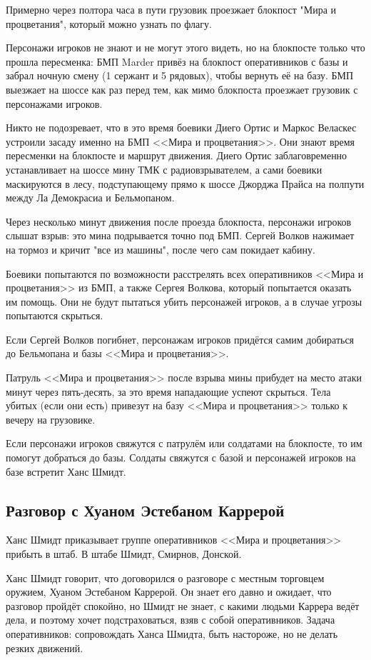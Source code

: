 \documentclass{article}
\begin{document}
Примерно через полтора часа в пути грузовик проезжает блокпост "Мира и
процветания", который можно узнать по флагу.

Персонажи игроков не знают и не могут этого видеть, но на блокпосте
только что прошла пересменка: БМП Marder привёз на блокпост
оперативников с базы и забрал ночную смену (1 сержант и 5 рядовых),
чтобы вернуть её на базу. БМП выезжает на шоссе как раз перед тем, как
мимо блокпоста проезжает грузовик с персонажами игроков.

Никто не подозревает, что в это время боевики Диего Ортис и Маркос
Веласкес устроили засаду именно на БМП <<Мира и процветания>>. Они знают
время пересменки на блокпосте и маршрут движения. Диего Ортис
заблаговременно устанавливает на шоссе мину ТМК с радиовзрывателем, а
сами боевики маскируются в лесу, подступающему прямо к шоссе Джорджа
Прайса на полпути между Ла Демокрасиа и Бельмопаном.

Через несколько минут движения после проезда блокпоста, персонажи
игроков слышат взрыв: это мина подрывается точно под БМП. Сергей Волков
нажимает на тормоз и кричит "все из машины", после чего сам покидает
кабину.

Боевики попытаются по возможности расстрелять всех оперативников <<Мира и
процветания>> из БМП, а также Сергея Волкова, который попытается оказать
им помощь. Они не будут пытаться убить персонажей игроков, а в случае
угрозы попытаются скрыться.

Если Сергей Волков погибнет, персонажам игроков придётся самим
добираться до Бельмопана и базы <<Мира и процветания>>.

Патруль <<Мира и процветания>> после взрыва мины прибудет на место атаки
минут через пять-десять, за это время нападающие успеют скрыться. Тела
убитых (если они есть) привезут на базу <<Мира и процветания>> только к
вечеру на грузовике.

Если персонажи игроков свяжутся с патрулём или солдатами на блокпосте,
то им помогут добраться до базы. Солдаты свяжутся с базой и персонажей
игроков на базе встретит Ханс Шмидт.

\subsection{Разговор с Хуаном Эстебаном
Каррерой}\label{carrera-meeting}

Ханс Шмидт приказывает группе оперативников <<Мира и процветания>> прибыть
в штаб. В штабе Шмидт, Смирнов, Донской.

Ханс Шмидт говорит, что договорился о разговоре с местным торговцем
оружием, Хуаном Эстебаном Каррерой. Он знает его давно и ожидает, что
разговор пройдёт спокойно, но Шмидт не знает, с какими людьми Каррера
ведёт дела, и поэтому хочет подстраховаться, взяв с собой оперативников.
Задача оперативников: сопровождать Ханса Шмидта, быть настороже, но не
делать резких движений.
\end{document}
